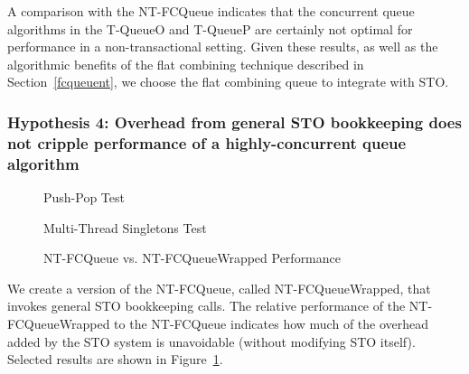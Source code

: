 A comparison with the NT-FCQueue indicates that the concurrent queue algorithms in the T-QueueO and T-QueueP are certainly not optimal for performance in a non-transactional setting.
Given these results, as well as the algorithmic benefits of the flat combining technique described in Section~\ref{fcqueuent}, we choose the flat combining queue to integrate with STO.

\vspace{12pt}
\noindent{}

\subsubsection{Hypothesis 4: Overhead from general STO bookkeeping does not cripple performance of a highly-concurrent queue algorithm}

\begin{figure}[H]
    \centering
	\begin{minipage}{0.75\textwidth}
        \caption*{Push-Pop Test}
        \vspace{12pt}
	\end{minipage}
   	\begin{minipage}{0.75\textwidth}
        \caption*{Multi-Thread Singletons Test}
	\end{minipage}
        \caption{NT-FCQueue vs. NT-FCQueueWrapped Performance}
    \label{fig:wrappedqs}
\end{figure}

We create a version of the NT-FCQueue, called NT-FCQueueWrapped, that invokes general STO bookkeeping calls. The relative performance of the NT-FCQueueWrapped to the NT-FCQueue indicates how much of the overhead added by the STO system is unavoidable (without modifying STO itself). 
Selected results are shown in Figure~\ref{fig:wrappedqs}.


